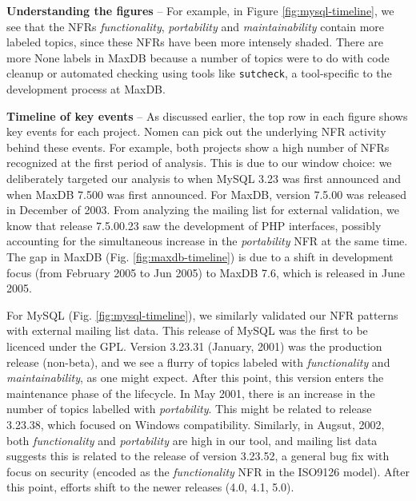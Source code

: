 \documentclass[]{sig-alternate}
\begin{document}
\textbf{Understanding the figures} -- For example, in Figure \ref{fig:mysql-timeline}, we see that the NFRs \emph{functionality}, \emph{portability} and \emph{maintainability} contain more labeled topics, since these NFRs have been more intensely shaded. %
There are more \textsf{None} labels in MaxDB because a number of topics were to do with code cleanup or automated checking using tools like \texttt{sutcheck}, a tool-specific to the development process at MaxDB. 

\textbf{Timeline of key events} -- As discussed earlier, the top row in each figure shows key events for each project. \textsf{Nomen} can pick out the underlying NFR activity behind these events. For example, both projects show a high number of NFRs recognized at the first period of analysis. 
This is due to our window choice: we deliberately targeted our analysis to when MySQL 3.23 was first announced %
and when MaxDB 7.500 was first announced. For MaxDB, version 7.5.00  was released in December of 2003. 
From analyzing the mailing list for external validation, we know that release 7.5.00.23 saw the development of PHP interfaces, possibly accounting for the simultaneous increase in the \emph{portability} NFR at the same time.
The gap in MaxDB (Fig. \ref{fig:maxdb-timeline}) is due to a shift in development focus (from February 2005 to Jun 2005) to MaxDB 7.6, which is released in June 2005.

For MySQL (Fig. \ref{fig:mysql-timeline}), we similarly validated our NFR patterns with external mailing list data. This release of MySQL was the first to be licenced under the GPL. Version 3.23.31 (January, 2001) was the production release (non-beta), and we see a flurry of topics labeled with \emph{functionality} and \emph{maintainability}, as one might expect. After this point, this version enters the maintenance phase of the lifecycle. In May 2001, there is an increase in the number of topics labelled with \emph{portability}. This might be related to release 3.23.38, which focused on Windows compatibility. Similarly, in Augsut, 2002, both \emph{functionality} and \emph{portability} are high in our tool, and mailing list data suggests this is related to the release of version 3.23.52, a general bug fix with focus on security (encoded as the \emph{functionality} NFR in the ISO9126 model). After this point, efforts shift to the newer releases (4.0, 4.1, 5.0). 
\end{document}
